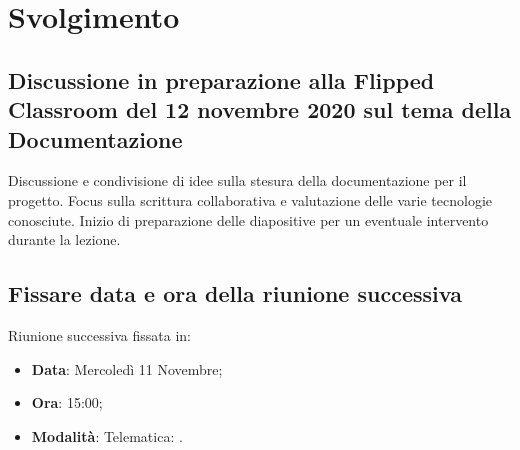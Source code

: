 \documentclass[]{article}
\begin{document}
\newpage

	\section{Svolgimento}
		\subsection{Discussione in preparazione alla Flipped Classroom del 12 novembre 2020 sul tema della Documentazione}
		Discussione e condivisione di idee sulla stesura della documentazione per il progetto. Focus sulla scrittura collaborativa e valutazione delle varie tecnologie conosciute.
		Inizio di preparazione delle diapositive per un eventuale intervento durante la lezione.\\
		
		\subsection{Fissare data e ora della riunione successiva}
		Riunione successiva fissata in:
		\begin{itemize}
			\item \textbf{Data}: Mercoledì 11 Novembre;
			\item \textbf{Ora}: 15:00;
			\item \textbf{Modalità}: Telematica: .
		\end{itemize}
\end{document}
